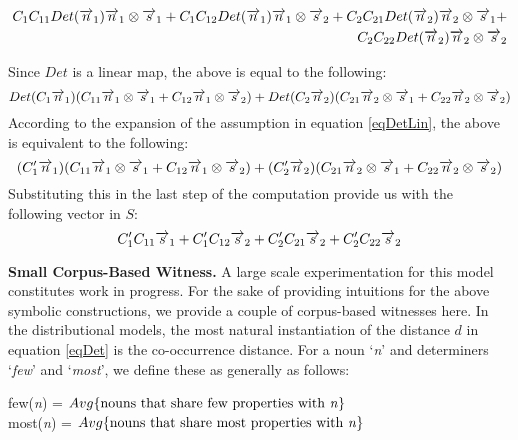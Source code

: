 \documentclass[a4paper,11pt]{easychair}
\begin{document}
\begin{align*}
C_1C_{11} Det(\overrightarrow{n}_1) \overrightarrow{n}_1 \otimes \overrightarrow{s}_1  + C_1 C_{12} Det(\overrightarrow{n}_1) \overrightarrow{n}_1 \otimes \overrightarrow{s}_2  + 
C_2 C_{21} Det(\overrightarrow{n}_2) \overrightarrow{n}_2 \otimes \overrightarrow{s}_1 + \\
C_2 C_{22} Det(\overrightarrow{n}_2) \overrightarrow{n}_2 \otimes \overrightarrow{s}_2
\end{align*}

\noindent
Since $Det$ is a linear map, the above is equal to the following:
\[
Det(C_1\overrightarrow{n}_1) (C_{11} \overrightarrow{n}_1 \otimes \overrightarrow{s}_1 + C_{12} \overrightarrow{n}_1 \otimes \overrightarrow{s}_2) + Det(C_2 \overrightarrow{n}_2)(C_{21} \overrightarrow{n}_2 \otimes \overrightarrow{s}_1 + C_{22} \overrightarrow{n}_2 \otimes \overrightarrow{s}_2)
\]
According to the expansion of the assumption in equation \ref{eqDetLin},  the above is equivalent to the following:
\[
(C'_1\overrightarrow{n}_1) (C_{11} \overrightarrow{n}_1 \otimes \overrightarrow{s}_1 + C_{12} \overrightarrow{n}_1 \otimes \overrightarrow{s}_2) + (C'_2 \overrightarrow{n}_2)(C_{21} \overrightarrow{n}_2 \otimes \overrightarrow{s}_1 + C_{22} \overrightarrow{n}_2 \otimes \overrightarrow{s}_2)
\]
Substituting  this in the last step of the computation provide us with the following vector in $S$:
\begin{equation}\label{eqSent}
C'_1 C_{11} \overrightarrow{s}_1 + C'_1 C_{12} \overrightarrow{s}_2 + C'_2 C_{21} \overrightarrow{s}_2 + C'_2 C_{22} \overrightarrow{s}_2
\end{equation}
%

\noindent
{\bf Small Corpus-Based Witness.} 
A large scale experimentation  for this model constitutes work in progress.  For the sake of providing  intuitions for the above symbolic constructions, we provide a couple of corpus-based witnesses here. In the distributional models, the most natural instantiation of the distance $d$  in equation \ref{eqDet} is the  co-occurrence distance. For a noun `\emph{n}' and determiners `\emph{few}' and `\emph{most}', we  define these as generally as follows:

\begin{center}
few(\emph{n}) = $Avg\{\mbox{nouns that share  few properties with \emph{n}}\}$\\
most(\emph{n}) = $Avg\{\mbox{nouns that share most properties  with \emph{n}}\}$
\end{center}
\end{document}
